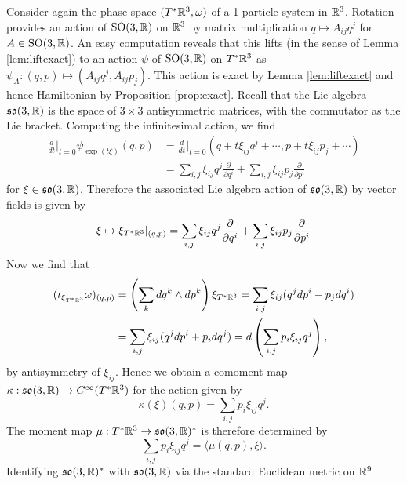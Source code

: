 \documentclass{amsart}
\begin{document}
\begin{example}
    Consider again the phase space $(T^*\mathbb{R}^3,\omega)$ of a 1-particle system in $\mathbb{R}^3$.
    Rotation provides an action of $\operatorname{SO}(3,\mathbb{R})$ on $\mathbb{R}^3$ by matrix multiplication $q\mapsto A_{ij}q^j$
    for $A\in\operatorname{SO}(3,\mathbb{R})$. An easy computation reveals that this lifts (in the sense of Lemma \ref{lem:liftexact})
    to an action $\psi$ of $\operatorname{SO}(3,\mathbb{R})$
    on $T^*\mathbb{R}^3$ as $\psi_A:(q,p)\mapsto (A_{ij}q^j,A_{ij}p_j)$. This action is exact by Lemma \ref{lem:liftexact}
    and hence Hamiltonian by Proposition \ref{prop:exact}. Recall that the Lie algebra $\mathfrak{so}(3,\mathbb{R})$
    is the space of $3\times 3$ antisymmetric matrices, with the commutator as the Lie bracket.
    Computing the infinitesimal action, we find
    \begin{align*}
        \frac{d}{dt}\bigg|_{t=0} \psi_{\exp(t\xi)}(q,p) &= \frac{d}{dt}\bigg|_{t=0}\left( q+t\xi_{ij}q^j+\cdots, p+t\xi_{ij}p_j+\cdots\right)\\
        &=\sum_{i,j}\xi_{ij} q^j\frac{\partial}{\partial q^i} + \sum_{i,j}\xi_{ij}p_j\frac{\partial}{\partial p^i}
    \end{align*}
    for $\xi\in\mathfrak{so}(3,\mathbb{R})$. Therefore the associated Lie algebra action of $\mathfrak{so}(3,\mathbb{R})$ by
    vector fields is given by
    \begin{equation*}
        \xi \mapsto \xi_{T^*\mathbb{R}^3}|_{(q,p)}=\sum_{i,j}\xi_{ij} q^j\frac{\partial}{\partial q^i} + \sum_{i,j}\xi_{ij}p_j\frac{\partial}{\partial p^i}
    \end{equation*}
    Now we find that
    \begin{align*}
        (\iota_{\xi_{T^*\mathbb{R}^3}}\omega)_{(q,p)} &= \left(\sum_kdq^k\wedge dp^k\right)\xi_{T^*\mathbb{R}^3}
        = \sum_{i,j}\xi_{ij}(q^jdp^i - p_jdq^i)\\
        &= \sum_{i,j}\xi_{ij}(q^jdp^i + p_idq^j)
        = d\left(\sum_{i,j}p_i\xi_{ij}q^j\right),
    \end{align*}
    by antisymmetry of $\xi_{ij}$. Hence we obtain a comoment map $\kappa:\mathfrak{so}(3,\mathbb{R})\to C^\infty(T^*\mathbb{R}^3)$
    for the action given by
    \begin{equation*}
        \kappa(\xi)(q,p) = \sum_{i,j} p_i\xi_{ij}q^j.
    \end{equation*}
    The moment map $\mu:T^*\mathbb{R}^3\to\mathfrak{so}(3,\mathbb{R})^*$ is therefore determined by
    \begin{equation*}
        \sum_{i,j}p_i\xi_{ij}q^j = \langle \mu(q,p), \xi\rangle.
    \end{equation*}
    Identifying $\mathfrak{so}(3,\mathbb{R})^*$ with $\mathfrak{so}(3,\mathbb{R})$ via the standard Euclidean metric on $\mathbb{R}^9$

\end{example}
\end{document}
